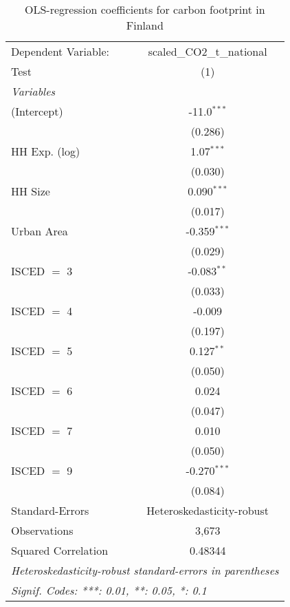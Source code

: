 
\begin{table}[htbp!]
   \centering
   \small
   \begin{adjustbox}{width = 1\textwidth, max height = 0.95\textheight, center}
      \begin{threeparttable}[b]
         \caption{\label{tab:OLS_2_FIN} OLS-regression coefficients for carbon footprint in Finland}
         \begin{tabular}{lc}
            \tabularnewline \midrule \midrule
            Dependent Variable: & scaled\_CO2\_t\_national\\     
            Test                & (1)\\  
            \midrule
            \emph{Variables}\\
            (Intercept)         & -11.0$^{***}$\\   
                                & (0.286)\\   
            HH Exp. (log)       & 1.07$^{***}$\\   
                                & (0.030)\\   
            HH Size             & 0.090$^{***}$\\   
                                & (0.017)\\   
            Urban Area          & -0.359$^{***}$\\   
                                & (0.029)\\   
            ISCED $=$ 3         & -0.083$^{**}$\\   
                                & (0.033)\\   
            ISCED $=$ 4         & -0.009\\   
                                & (0.197)\\   
            ISCED $=$ 5         & 0.127$^{**}$\\   
                                & (0.050)\\   
            ISCED $=$ 6         & 0.024\\   
                                & (0.047)\\   
            ISCED $=$ 7         & 0.010\\   
                                & (0.050)\\   
            ISCED $=$ 9         & -0.270$^{***}$\\   
                                & (0.084)\\   
            \midrule 
            Standard-Errors     & Heteroskedasticity-robust \\   
            Observations        & 3,673\\  
            Squared Correlation & 0.48344\\  
            \midrule \midrule
            \multicolumn{2}{l}{\emph{Heteroskedasticity-robust standard-errors in parentheses}}\\
            \multicolumn{2}{l}{\emph{Signif. Codes: ***: 0.01, **: 0.05, *: 0.1}}\\
         \end{tabular}
         

\end{threeparttable}
\end{adjustbox}
\end{table}
